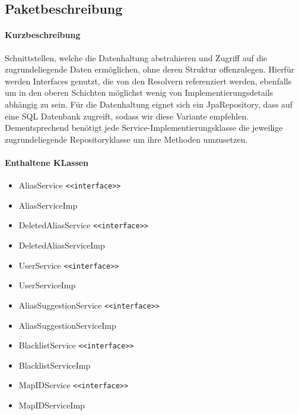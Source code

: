 \subsection*{Paketbeschreibung}%
\paragraph*{Kurzbeschreibung}
Schnittstellen, welche die Datenhaltung abstrahieren und Zugriff auf die zugrundeliegende Daten ermöglichen, ohne deren Struktur offenzulegen.
Hierfür werden Interfaces genutzt, die von den Resolvern referenziert werden, ebenfalls um in den oberen Schichten möglichst 
wenig von Implementierungsdetails abhängig zu sein. Für die Datenhaltung eignet sich ein JpaRepository, dass auf 
eine SQL Datenbank zugreift, sodass wir diese Variante empfehlen. Dementsprechend benötigt jede Service-Implementierungsklasse die jeweilige 
zugrundeliegende Repositoryklasse um ihre Methoden umzusetzen. 
\paragraph*{Enthaltene KLassen}
\begin{itemize}
    \item AliasService \texttt{<<interface>>}
    \item AliasServiceImp
    \item DeletedAliasService \texttt{<<interface>>}
    \item DeletedAliasServiceImp
    \item UserService \texttt{<<interface>>}
    \item UserServiceImp
    \item AliasSuggestionService \texttt{<<interface>>}
    \item AliasSuggestionServiceImp
    \item BlacklistService \texttt{<<interface>>}
    \item BlacklistServiceImp
    \item MapIDService \texttt{<<interface>>}
    \item MapIDServiceImp
\end{itemize}

